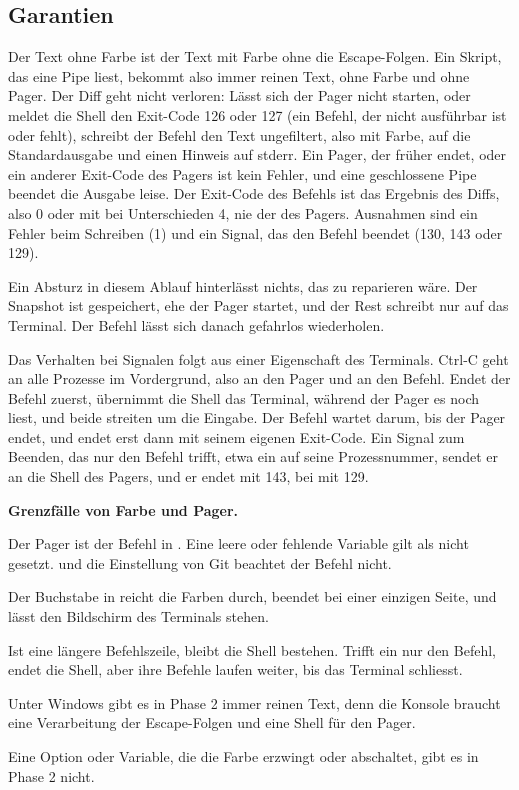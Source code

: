 \subsection{Garantien}

Der Text ohne Farbe ist der Text mit Farbe ohne die Escape-Folgen. Ein Skript, das eine Pipe liest,
bekommt also immer reinen Text, ohne Farbe und ohne Pager. Der Diff geht nicht verloren: Lässt
sich der Pager nicht starten, oder meldet die Shell den Exit-Code 126 oder 127 (ein Befehl, der
nicht ausführbar ist oder fehlt), schreibt der Befehl den Text ungefiltert, also mit Farbe, auf die
Standardausgabe und einen Hinweis auf stderr. Ein Pager, der früher endet, oder ein anderer
Exit-Code des Pagers ist kein Fehler, und eine geschlossene Pipe beendet die Ausgabe leise.
Der Exit-Code des Befehls ist das Ergebnis des Diffs, also 0 oder mit  bei
Unterschieden 4, nie der des Pagers. Ausnahmen sind ein Fehler beim Schreiben (1) und ein Signal,
das den Befehl beendet (130, 143 oder 129).

Ein Absturz in diesem Ablauf hinterlässt nichts, das zu reparieren wäre. Der Snapshot ist
gespeichert, ehe der Pager startet, und der Rest schreibt nur auf das Terminal. Der Befehl lässt
sich danach gefahrlos wiederholen.

Das Verhalten bei Signalen folgt aus einer Eigenschaft des Terminals. Ctrl-C geht an alle Prozesse
im Vordergrund, also an den Pager und an den Befehl. Endet der Befehl zuerst, übernimmt die Shell
das Terminal, während der Pager es noch liest, und beide streiten um die Eingabe. Der Befehl
wartet darum, bis der Pager endet, und endet erst dann mit seinem eigenen Exit-Code. Ein Signal
zum Beenden, das nur den Befehl trifft, etwa ein  auf seine Prozessnummer, sendet er
an die Shell des Pagers, und er endet mit 143, bei  mit 129.

\startinfobox
{\bf Grenzfälle von Farbe und Pager.}
\startitemize
\item Der Pager ist der Befehl in . Eine leere oder fehlende Variable gilt als nicht
gesetzt.  und die Einstellung  von Git beachtet der Befehl nicht.
\item Der Buchstabe  in  reicht die Farben durch,  beendet
 bei einer einzigen Seite, und  lässt den Bildschirm des Terminals stehen.
\item Ist  eine längere Befehlszeile, bleibt die Shell bestehen. Trifft ein
 nur den Befehl, endet die Shell, aber ihre Befehle laufen weiter,
bis das Terminal schliesst.
\item Unter Windows gibt es in Phase 2 immer reinen Text, denn die Konsole braucht eine
Verarbeitung der Escape-Folgen und eine Shell für den Pager.
\item Eine Option oder Variable, die die Farbe erzwingt oder abschaltet, gibt es in Phase 2
nicht.
\stopitemize
\stopinfobox

